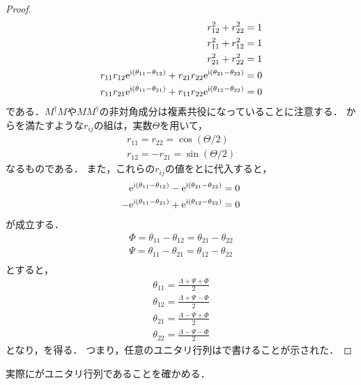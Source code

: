 \documentclass{report}
\begin{document}
\begin{proof}
\begin{align}
      r_{12}^2 + r_{22}^2 = 1 \label{r12-r22}\\ 
      r_{11}^2 + r_{12}^2 = 1 \label{r11-r12}\\ 
      r_{21}^2 + r_{22}^2 = 1 \label{r21-r22}\\ 
      r_{11}r_{12}\mathrm{e}^{\mathrm{i}(\theta_{11} - \theta_{12})} + r_{21}r_{22}\mathrm{e}^{\mathrm{i}(\theta_{21} - \theta_{22})} = 0 \label{angle-1}\\ 
      r_{11}r_{21}\mathrm{e}^{\mathrm{i}(\theta_{11} - \theta_{21})} + r_{11}r_{22}\mathrm{e}^{\mathrm{i}(\theta_{12} - \theta_{22})} = 0 \label{angle-2}
    \end{align}
    である．$M^{\dag}M$や$MM^{\dag}$の非対角成分は複素共役になっていることに注意する．
    からを満たすような$r_{ij}$の組は，実数$\Theta$を用いて，
    \begin{align}
      r_{11} = r_{22} = \cos(\Theta / 2) \\ 
      r_{12} = -r_{21} = \sin(\Theta / 2)
    \end{align}
    なるものである．
    また，これらの$r_{ij}$の値をとに代入すると，
    \begin{align}
      \mathrm{e}^{\mathrm{i}(\theta_{11} - \theta_{12})} - \mathrm{e}^{\mathrm{i}(\theta_{21} - \theta_{22})} = 0 \\ 
      -\mathrm{e}^{\mathrm{i}(\theta_{11} - \theta_{21})} + \mathrm{e}^{\mathrm{i}(\theta_{12} - \theta_{22})} = 0
    \end{align}
    が成立する．
    \begin{align}
      \Phi = \theta_{11} - \theta_{12} = \theta_{21} - \theta_{22} \\ 
      \Psi = \theta_{11} - \theta_{21} = \theta_{12} - \theta_{22} \\ 
    \end{align}
    とすると，
    \begin{align}
      \theta_{11} = \frac{\Lambda + \Psi + \Phi}{2} \\ 
      \theta_{12} = \frac{\Lambda + \Psi - \Phi}{2} \\ 
      \theta_{21} = \frac{\Lambda - \Psi + \Phi}{2} \\ 
      \theta_{22} = \frac{\Lambda - \Psi - \Phi}{2}
    \end{align}
    となり，を得る．
    つまり，任意のユニタリ行列はで書けることが示された．
  \end{proof}
  実際にがユニタリ行列であることを確かめる．
\end{document}
